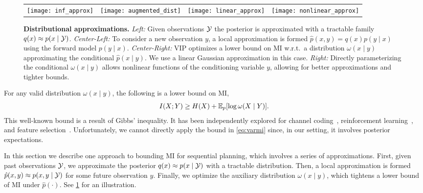 \begin{figure*}[t]
  \centering
  \begin{tabular}{cccc}
    \hspace{-9mm}\texttt{[image: inf\_approx]} &
    \hspace{-9mm}\texttt{[image: augmented\_dist]} &
    \hspace{-9mm}\texttt{[image: linear\_approx]} &
    \hspace{-9mm}\texttt{[image: nonlinear\_approx]}
  \end{tabular}

  \caption{\small \textbf{Distributional approximations.} \emph{Left:}
  Given observations $\mathcal{Y}$ the posterior is approximated with a
  tractable family $q(x) \approx p(x\mid \mathcal{Y})$.  \emph{Center-Left:}
  To consider a new observation $y$, a local approximation is formed
  $\hat{p}(x,y) = q(x) p(y \mid x)$ using the forward model $p(y\mid
  x)$.  \emph{Center-Right:} VIP optimizes a lower bound on MI
  w.r.t.~a distribution $\omega(x\mid y)$ approximating the
  conditional $\hat{p}(x\mid y)$. We use a linear Gaussian
  approximation in this case.  \emph{Right:} Directly parameterizing
  the conditional $\omega(x\mid y)$ allows nonlinear functions of the
  conditioning variable $y$, allowing for better approximations and
  tighter bounds.}

  \label{fig:approx}
\end{figure*}

For any valid distribution $\omega(x\mid y)$, the following is a lower
bound on MI,
\begin{equation}\label{eq:varmi}
  I(X;Y) \geq H(X) + \mathbb{E}_p[ \log \omega(X\mid Y) ].
\end{equation}
This well-known bound is a result of Gibbs' inequality.  It has been
independently explored for channel coding~\citep{agakov2004algorithm},
reinforcement learning~\citep{mohamed2015variational}, and feature
selection~\citep{gao2016variational, chen2018learning}.
Unfortunately, we cannot directly apply the bound in
\EQN\eqref{eq:varmi} since, in our setting, it involves posterior
expectations.

In this section we describe one approach to bounding MI for sequential
planning, which involves a series of approximations.  First, given
past observations $\mathcal{Y}$, we approximate the posterior
\mbox{$q(x)\approx p(x\mid \mathcal{Y})$} with a tractable distribution.
Then, a local approximation is formed \mbox{$\hat{p}(x,y) \approx
  p(x,y\mid \mathcal{Y})$} for some future observation $y$.  Finally, we
optimize the auxiliary distribution $\omega(x\mid y)$, which tightens
a lower bound of MI under $\hat{p}(\cdot)$.  See \FIG\ref{fig:approx}
for an illustration.

